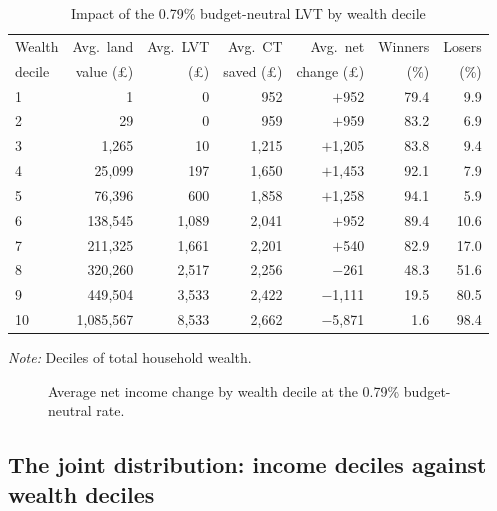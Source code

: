 \begin{table}[htbp]
\centering
\caption{Impact of the 0.79\% budget-neutral LVT by wealth decile}
\label{tab:wealth_impact}
\begin{tabular}{lrrrrrr}
\toprule
Wealth & Avg.\ land & Avg.\ LVT & Avg.\ CT & Avg.\ net & Winners & Losers \\
decile & value (\pounds) & (\pounds) & saved (\pounds) & change (\pounds) & (\%) & (\%) \\
\midrule
1  & 1             & 0       & 952     & $+$952     & 79.4 & 9.9 \\
2  & 29            & 0       & 959     & $+$959     & 83.2 & 6.9 \\
3  & 1{,}265       & 10      & 1{,}215 & $+$1{,}205 & 83.8 & 9.4 \\
4  & 25{,}099      & 197     & 1{,}650 & $+$1{,}453 & 92.1 & 7.9 \\
5  & 76{,}396      & 600     & 1{,}858 & $+$1{,}258 & 94.1 & 5.9 \\
6  & 138{,}545     & 1{,}089 & 2{,}041 & $+$952     & 89.4 & 10.6 \\
7  & 211{,}325     & 1{,}661 & 2{,}201 & $+$540     & 82.9 & 17.0 \\
8  & 320{,}260     & 2{,}517 & 2{,}256 & $-$261     & 48.3 & 51.6 \\
9  & 449{,}504     & 3{,}533 & 2{,}422 & $-$1{,}111 & 19.5 & 80.5 \\
10 & 1{,}085{,}567 & 8{,}533 & 2{,}662 & $-$5{,}871 & 1.6  & 98.4 \\
\bottomrule
\end{tabular}

\medskip
{\footnotesize\emph{Note:} Deciles of total household wealth.}
\end{table}

\begin{figure}[htbp]
\centering
{}
\caption{Average net income change by wealth decile at the 0.79\% budget-neutral rate.}
\label{fig:net_wealth}
\end{figure}

\subsection{The joint distribution: income deciles against wealth deciles}
\label{sec:jointdist}

